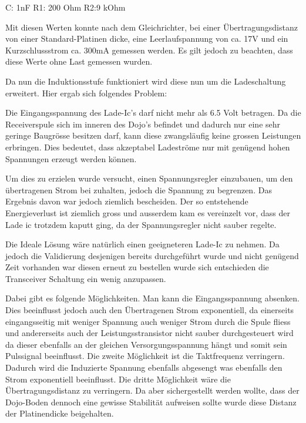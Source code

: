 \begin{center}
C: 1nF
R1: 200 Ohm
R2:9 kOhm
\end{center}

Mit diesen Werten konnte nach dem Gleichrichter, bei einer Übertragungsdistanz von einer Standard-Platinen dicke, eine Leerlaufspannung von ca. 17V und ein Kurzschlussstrom ca. 300mA gemessen werden. Es gilt jedoch zu beachten, dass diese Werte ohne Last gemessen wurden. 

Da nun die Induktionsstufe funktioniert wird diese nun um die Ladeschaltung erweitert. Hier ergab sich folgendes Problem:

Die Eingangsspannung des Lade-Ic’s darf nicht mehr als 6.5 Volt betragen. Da die Receiverspule sich im inneren des Dojo’s befindet und dadurch nur eine sehr geringe Baugrösse besitzen darf, kann diese zwangsläufig keine grossen Leistungen erbringen. Dies bedeutet, dass akzeptabel Ladeströme nur mit genügend hohen Spannungen erzeugt werden können.

Um dies zu erzielen wurde versucht, einen Spannungsregler einzubauen, um den übertragenen Strom bei zuhalten, jedoch die Spannung zu begrenzen. Das Ergebnis davon war jedoch ziemlich bescheiden. Der so entstehende Energieverlust ist ziemlich gross und ausserdem kam es vereinzelt vor, dass der Lade ic trotzdem kaputt ging, da der Spannungsregler nicht sauber regelte. 

Die Ideale Lösung wäre natürlich einen geeigneteren Lade-Ic zu nehmen. Da jedoch die Validierung desjenigen bereits durchgeführt wurde und nicht genügend Zeit vorhanden war diesen erneut zu bestellen wurde sich entschieden die Transceiver Schaltung ein wenig anzupassen.

Dabei gibt es folgende Möglichkeiten. Man kann die Eingangsspannung absenken. Dies beeinflusst jedoch auch den Übertragenen Strom exponentiell, da einerseits eingangsseitig mit weniger Spannung auch weniger Strom durch die Spule fliess und andererseits auch der Leistungsstransistor nicht sauber durchgesteuert wird da dieser ebenfalls an der gleichen Versorgungsspannung hängt und somit sein Pulssignal beeinflusst. Die zweite Möglichkeit ist die Taktfrequenz verringern. Dadurch wird die Induzierte Spannung ebenfalls abgesengt was ebenfalls den Strom exponentiell beeinflusst. Die dritte Möglichkeit wäre die Übertragungsdistanz zu verringern. Da aber sichergestellt werden wollte, dass der Dojo-Boden dennoch eine gewisse Stabilität aufweisen sollte wurde diese Distanz der Platinendicke beigehalten.

